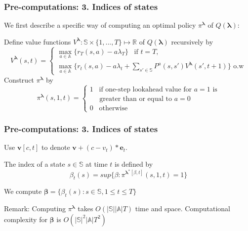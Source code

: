 \documentclass{beamer}
\newcommand{\betav}{\pmb{\beta}}
\newcommand{\lambdav}{\pmb{\lambda}}
\newcommand{\substates}{\mathbb{S}}
\newcommand{\substate}{s}
\newcommand{\subactions}{\mathbb{A}}
\newcommand{\subaction}{a}
\begin{document}
\begin{frame}
\frametitle{Pre-computations: 3. Indices of states}

We first describe a specific way of computing an optimal policy $\pi^{\lambdav}$ of $Q(\lambdav)$:

\vspace{0.5cm}
Define value functions $V^{\lambdav}:\substates\times \{1,...,T\}\mapsto \mathbb{R}$ of $Q(\lambdav)$ recursively by
\begin{equation}
V^{\lambdav}(s,t)=
\begin{cases}
	\max_{\subaction\in \subactions}\{r_T(s,a)-a\lambda_T\} \;\;\; \text{if $t=T$,}\\
	\max_{\subaction\in\subactions}\{r_t(s,a)-a\lambda_t+\sum_{s'\in\substates}P^{a}(s,s')V^{\lambdav}(s',t+1)\} \text{ o.w}
\end{cases} 
\end{equation}
Construct $\pi^{\lambdav}$ by
\begin{equation}
\pi^{\lambdav}(s,1,t)=
\begin{cases*}
1\;\;\;\text{if one-step lookahead value for $a=1$ is} \\
\;\;\;\;\;\text{greater than or equal to $a=0$}\\
0 \;\;\;\text{otherwise}
\end{cases*}
\end{equation}
\end{frame}

\begin{frame}
\frametitle{Pre-computations: 3. Indices of states}
Use $\mathbf{v}[c,t]$ to denote $\mathbf{v}+(c-v_t)*\mathbf{e}_t$.

\vspace{0.5cm}
The index of a state $\substate\in\substates$ at time $t$ is defined by
\begin{equation}
\beta_t(s) = sup\{\beta: \pi^{\lambdav^*[\beta,t]}(s,1,t)=1\}
\end{equation}

\vspace{0.5cm}
We compute $\betav = \{\beta_t(s):s\in\substates,1\leq t\leq T\}$


\vspace{0.5cm}
Remark: Computing $\pi^{\lambdav}$ takes $O(|\substates||\subactions|T)$ time and space. Computational complexity for $\betav$ is $O(|\substates|^2|\subactions|T^2)$
\end{frame}
\end{document}
